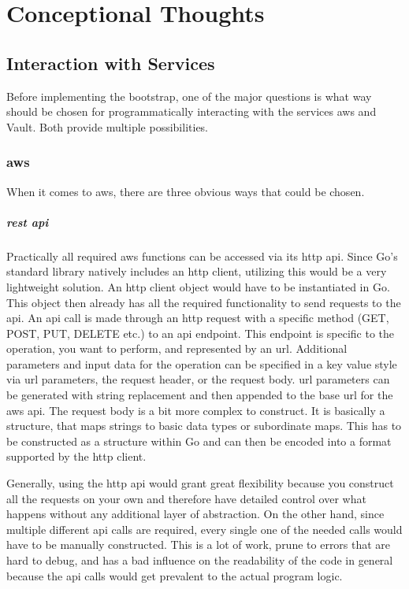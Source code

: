 \chapter{Conceptional Thoughts}
\label{sec:concept}

\section{Interaction with Services}
Before implementing the bootstrap, one of the major questions is what way should be chosen for programmatically interacting with the services \ac{aws} and Vault.
Both provide multiple possibilities.

\subsection{\ac{aws}}
When it comes to \ac{aws}, there are three obvious ways that could be chosen.

\paragraph{\acs{rest} \ac{api}}
Practically all required \ac{aws} functions can be accessed via its \ac{http} \ac{api}.
Since Go's standard library natively includes an \ac{http} client, utilizing this would be a very lightweight solution.
An \ac{http} client object would have to be instantiated in Go.
This object then already has all the required functionality to send requests to the \ac{api}.
An \ac{api} call is made through an \ac{http} request with a specific method (GET, POST, PUT, DELETE etc.) to an \ac{api} endpoint.
This endpoint is specific to the operation, you want to perform, and represented by an \ac{url}.
Additional parameters and input data for the operation can be specified in a key value style via \ac{url} parameters, the request header, or the request body.
\ac{url} parameters can be generated with string replacement and then appended to the base \ac{url} for the \ac{aws} \ac{api}.
The request body is a bit more complex to construct.
It is basically a structure, that maps strings to basic data types or subordinate maps.
This has to be constructed as a structure within Go and can then be encoded into a format supported by the \ac{http} client.

Generally, using the \ac{http} \ac{api} would grant great flexibility because you construct all the requests on your own and therefore have detailed control over what happens without any additional layer of abstraction.
On the other hand, since multiple different \ac{api} calls are required, every single one of the needed calls would have to be manually constructed.
This is a lot of work, prune to errors that are hard to debug, and has a bad influence on the readability of the code in general because the \ac{api} calls would get prevalent to the actual program logic.

